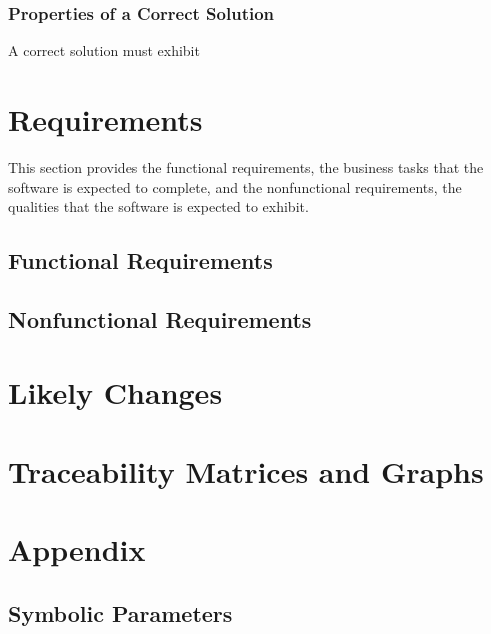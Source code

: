 \documentclass[12pt]{article}
\begin{document}
\subsubsection{Properties of a Correct Solution} \label{sec_CorrectSolution}

\noindent
A correct solution must exhibit 

\section{Requirements}

This section provides the functional requirements, the business tasks that the
software is expected to complete, and the nonfunctional requirements, the
qualities that the software is expected to exhibit.

\subsection{Functional Requirements}



\subsection{Nonfunctional Requirements}


\section{Likely Changes}    


\section{Traceability Matrices and Graphs}



\newpage





\newpage

\section{Appendix}


\subsection{Symbolic Parameters}
\end{document}
